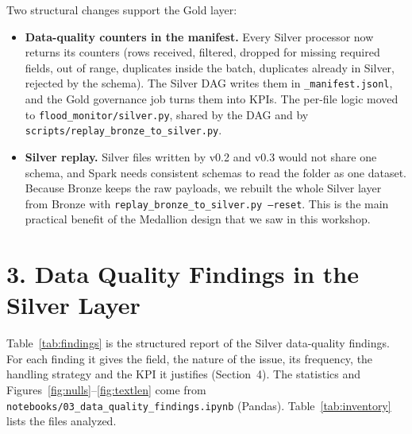 \documentclass[stu, 12pt, letterpaper, donotrepeattitle, floatsintext, natbib]{apa7}
\begin{document}
\noindent Two structural changes support the Gold layer:
\begin{itemize}
    \item \textbf{Data-quality counters in the manifest.} Every Silver processor now returns its counters (rows received, filtered, dropped for missing required fields, out of range, duplicates inside the batch, duplicates already in Silver, rejected by the schema). The Silver DAG writes them in \texttt{\_manifest.jsonl}, and the Gold governance job turns them into KPIs. The per-file logic moved to \texttt{flood\_monitor/silver.py}, shared by the DAG and by \texttt{scripts/replay\_bronze\_to\_silver.py}.
    \item \textbf{Silver replay.} Silver files written by v0.2 and v0.3 would not share one schema, and Spark needs consistent schemas to read the folder as one dataset. Because Bronze keeps the raw payloads, we rebuilt the whole Silver layer from Bronze with \texttt{replay\_bronze\_to\_silver.py --reset}. This is the main practical benefit of the Medallion design that we saw in this workshop.
\end{itemize}



\section{\large 3. Data Quality Findings in the Silver Layer}
Table~\ref{tab:findings} is the structured report of the Silver data-quality findings. For each finding it gives the field, the nature of the issue, its frequency, the handling strategy and the KPI it justifies (Section~4). The statistics and Figures~\ref{fig:nulls}--\ref{fig:textlen} come from \texttt{notebooks/03\_data\_quality\_findings.ipynb} (Pandas). Table~\ref{tab:inventory} lists the files analyzed.


\end{document}
